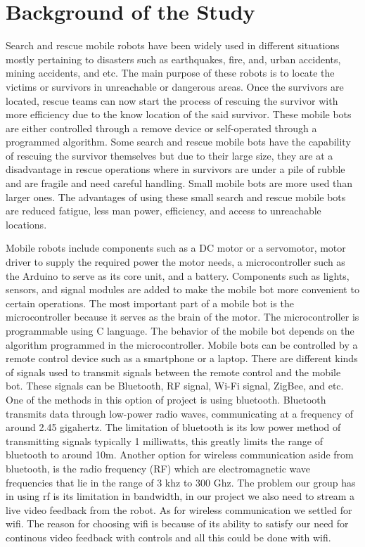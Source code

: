 \section{Background of the Study}

 Search and rescue mobile robots have been widely used in different situations mostly pertaining to disasters such as earthquakes, fire, and, urban accidents, mining accidents, and etc. The main purpose of these robots is to locate the victims or survivors in unreachable or dangerous areas. Once the survivors are located, rescue teams can now start the process of rescuing the survivor with more efficiency due to the know location of the said survivor. These mobile bots are either controlled through a remove device or self-operated through a programmed algorithm.  Some search and rescue mobile bots have the capability of rescuing the survivor themselves but due to their large size, they are at a disadvantage in rescue operations where in survivors are under a pile of rubble and are fragile and need careful handling. Small mobile bots are more used than larger ones. The advantages of using these small search and rescue mobile bots are reduced fatigue, less man power, efficiency, and access to unreachable locations. 

 Mobile robots include components such as a DC motor or a servomotor, motor driver to supply the required power the motor needs, a microcontroller such as the Arduino to serve as its core unit, and a battery. Components such as lights, sensors, and signal modules are added to make the mobile bot more convenient to certain operations. The most important part of a mobile bot is the microcontroller because it serves as the brain of the motor. The microcontroller is programmable using C language. The behavior of the mobile bot depends on the algorithm programmed in the microcontroller. Mobile bots can be controlled by a remote control device such as a smartphone or a laptop. There are different kinds of signals used to transmit signals between the remote control and the mobile bot. These signals can be Bluetooth, RF signal, Wi-Fi signal, ZigBee, and etc. One of the methods in this option of project is using bluetooth. Bluetooth transmits data through low-power radio waves, communicating at a frequency of around 2.45 gigahertz. The limitation of bluetooth is its low power method of transmitting signals typically 1 milliwatts, this greatly limits the range of bluetooth to around 10m. Another option for wireless communication aside from bluetooth, is the radio frequency (RF) which are electromagnetic wave frequencies that lie in the range of 3 khz to 300 Ghz. The problem our group has in using rf is its limitation in bandwidth, in our project we also need to stream a live video feedback from the robot. As for wireless communication we settled for wifi. The reason for choosing wifi is because of its ability to satisfy our need for continous video feedback with controls and all this could be done with wifi. 


